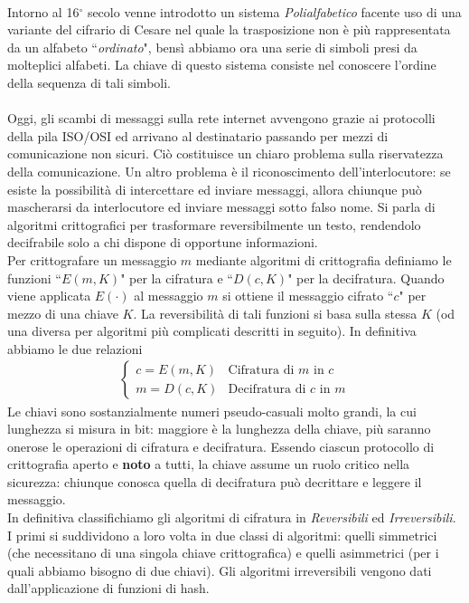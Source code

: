 \documentclass[a4paper,12pt]{tesiinfo}
\begin{document}
\\
Intorno al 16$^\circ$ secolo venne introdotto un sistema \textit{Polialfabetico} facente uso di una variante del cifrario di Cesare nel quale la trasposizione non \`e pi\`u rappresentata da un alfabeto ``\textit{ordinato}", bens\`i abbiamo ora una serie di simboli presi da molteplici alfabeti. La chiave di questo sistema consiste nel conoscere l'ordine della sequenza di tali simboli.
\\
\\
Oggi, gli scambi di messaggi sulla rete internet avvengono grazie ai protocolli della pila ISO/OSI ed arrivano al destinatario passando per mezzi di comunicazione non sicuri. Ci\`o costituisce un chiaro problema sulla riservatezza della comunicazione. Un altro problema \`e il riconoscimento dell'interlocutore: se esiste la possibilit\`a di intercettare ed inviare messaggi, allora chiunque pu\`o mascherarsi da interlocutore ed inviare messaggi sotto falso nome. Si parla di algoritmi crittografici per trasformare reversibilmente un testo, rendendolo decifrabile solo a chi dispone di opportune informazioni. 
\\
Per crittografare un messaggio $m$ mediante algoritmi di crittografia definiamo le funzioni ``$E(m,K)$" per la cifratura e ``$D(c, K)$" per la decifratura. Quando viene applicata $E(\cdot )$ al messaggio $m$ si ottiene il messaggio cifrato ``$c$" per mezzo di una chiave $K$. La reversibilit\`a di tali funzioni si basa sulla stessa $K$ (od una diversa per algoritmi pi\`u complicati descritti in seguito). In definitiva abbiamo le due relazioni 
\begin{align*}
    \begin{cases}
     c= E(m, K)  &\text{Cifratura di $m$ in $c$}\\
     m= D(c, K)  &\text{Decifratura di $c$ in $m$}
    \end{cases}
\end{align*}
Le chiavi sono sostanzialmente numeri pseudo-casuali molto grandi, la cui lunghezza si misura in bit: maggiore \`e la lunghezza della chiave, pi\`u saranno onerose le operazioni di cifratura e decifratura. Essendo ciascun protocollo di crittografia aperto e \textbf{noto} a tutti, la chiave assume un ruolo critico nella sicurezza: chiunque conosca quella di decifratura pu\`o decrittare e leggere il messaggio.
\\
In definitiva classifichiamo gli algoritmi di cifratura in \textit{Reversibili} ed \textit{Irreversibili}. I primi si suddividono a loro volta in due classi di algoritmi: quelli simmetrici (che necessitano di una singola chiave crittografica) e quelli asimmetrici (per i quali abbiamo bisogno di due chiavi). Gli algoritmi irreversibili vengono dati dall'applicazione di funzioni di hash.
%
%
%
\end{document}
